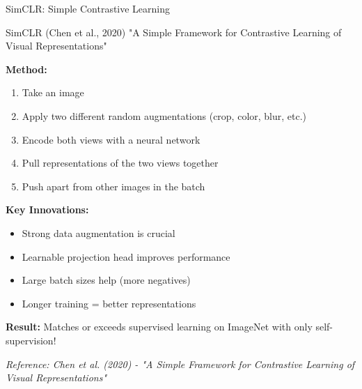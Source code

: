 \documentclass[aspectratio=169]{beamer}
\begin{document}
\begin{frame}[shrink=10]{SimCLR: Simple Contrastive Learning 🔬}
\begin{block}{SimCLR (Chen et al., 2020)}
"A Simple Framework for Contrastive Learning of Visual Representations"
\end{block}

\textbf{Method:}
\begin{enumerate}\setlength{\itemsep}{0pt}
    \item Take an image
    \item Apply two different random augmentations (crop, color, blur, etc.)
    \item Encode both views with a neural network
    \item Pull representations of the two views together
    \item Push apart from other images in the batch
\end{enumerate}

\vspace{0.5em}

\textbf{Key Innovations:}
\begin{itemize}\setlength{\itemsep}{0pt}
    \item Strong data augmentation is crucial
    \item Learnable projection head improves performance
    \item Large batch sizes help (more negatives)
    \item Longer training = better representations
\end{itemize}

\vspace{0.5em}

\textbf{Result:} Matches or exceeds supervised learning on ImageNet with only self-supervision!

\small
\textit{Reference: Chen et al. (2020) - "A Simple Framework for Contrastive Learning of Visual Representations"}
\end{frame}
\end{document}

